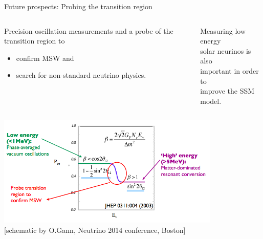 \begin{frame}[t]{Future prospects: Probing the transition region}

\begin{columns}
  \begin{column}{0.70\textwidth}
      Precision oscillation measurements and a probe of the {\color{red} transition region} to
      \begin{itemize}
         \item confirm MSW and
         \item search for non-standard neutrino physics.
      \end{itemize}
  \end{column}
  \begin{column}{0.30\textwidth}
      \begin{block}{}
      {\scriptsize
       \centering
         Measuring low energy \\ solar neurinos is also\\ important in order to\\ improve the SSM model.\\
      }
      \end{block}
  \end{column}
\end{columns}
\begin{center}
\includegraphics[width=0.80\textwidth]{./images/3nu/solar/Pee.png}\\
{\scriptsize \color{blue}[schematic by O.Gann, Neutrino 2014 conference, Boston]}
\end{center}
\end{frame}

%
%
%

